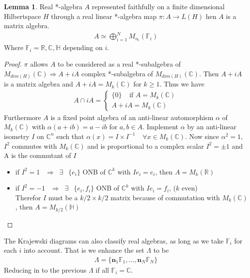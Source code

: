 \documentclass[a4paper]{article}
\theoremstyle{definition}
\theoremstyle{definition}
\theoremstyle{definition}
\theoremstyle{theorem}
\theoremstyle{theorem}
\newtheorem{lemma}{Lemma}
\theoremstyle{theorem}
\begin{document}
\begin{lemma}
    Real *-algebra $A$ represented faithfully on a finite dimensional
    Hilbertspace $H$  through a real linear *-algebra map $\pi: A \rightarrow
    L(H)$ hen $A$ is a matrix algebra.
    \begin{align}
        A \simeq \bigoplus _{i=1}^N M_{n_i} (\mathbb{F}_i)
    \end{align}
    Where $\mathbb{F}_i = \mathbb{R}, \mathbb{C}, \mathbb{H}$ depending on $i$.
\end{lemma}
\begin{proof}
    $\pi$ allows $A$ to be considered as a real *-subalgebra of
    $M_{dim(H)}(\mathbb{C}) \Rightarrow A+iA$ complex *-subalgebra of
    $M_{dim(H)}(\mathbb{C})$. Then $A+iA$ is a matrix algebra and $A+iA =
    M_k(\mathbb{C})$ for $k \geq 1$. Thus we have
    \begin{align}
        A \cap iA =
        \begin{cases}
            \{0\} \;\;\;\; \text{if $A = M_k(\mathbb{C})$}\\
            A+iA = M_k(\mathbb{C})
        \end{cases}
    \end{align}
    Furthermore $A$ is a fixed point algebra of an anti-linear automorphism
    $\alpha$ of $M_k(\mathbb{C})$ with $\alpha(a+ib) = a-ib$ for $a, b \in A$.
    Implement $\alpha$ by an anti-linear isometry $I$ on $\mathbb{C}^n$ such
    that $\alpha (x) = I\times I^{-1}\;\;\;\ \forall x\in M_k(\mathbb{C})$.
    Now since $\alpha^2 = 1$, $I^2$ commutes with $M_k(\mathbb{C})$ and is
    proportional to a complex scalar $I^2 = \pm 1 $ and A is the commutant of
    $I$
    \begin{itemize}
        \item if $I^2 = 1 \;\;\ \Rightarrow \;\; \exists \;\;\ \{e_i\}$ ONB of
            $\mathbb{C}^k$ with $Ie_i = e_i$, then $A=M_k(\mathbb{R})$
        \item if $I^2 = -1 \;\;\ \Rightarrow \;\; \exists \;\;\ \{e_i,f_i\}$ ONB of
            $\mathbb{C}^k$ with $Ie_i = f_i$, ($k$ even)\\
            Therefor $I$ must be a $k/2 \times k/2$ matrix because of commutation with
            $M_k(\mathbb{C})$, then $A = M_{k/2} (\mathbb{H})$
    \end{itemize}
\end{proof}
The Krajewski diagrams can also classify real algebras, as long as we take
$\mathbb{F}_i$ for each $i$ into account. That is we enhance the set $\Lambda$
to be
\begin{align}
    \Lambda = \{ \textbf{n}_1 \mathbb{F}_1,\dots, \textbf{n}_N \mathbb{F}_N\}
\end{align}
Reducing in to the previous $\Lambda$ if all $\mathbb{F}_i = \mathbb{C}$.
\end{document}
